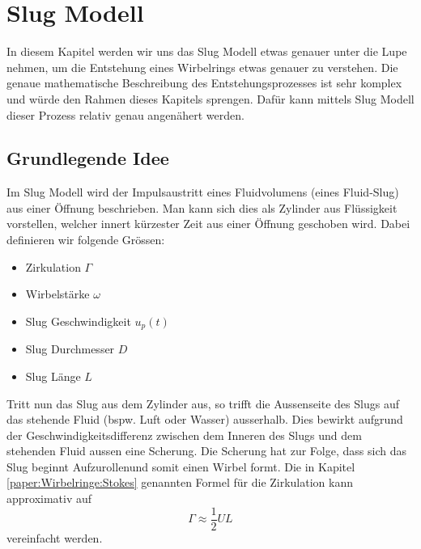 %
%
%
\section{Slug Modell}
In diesem Kapitel werden wir uns das Slug Modell etwas genauer unter die Lupe nehmen, um die Entstehung eines Wirbelrings etwas genauer zu verstehen.
Die genaue mathematische Beschreibung des Entstehungsprozesses ist sehr komplex und würde den Rahmen dieses Kapitels sprengen.
Dafür kann mittels Slug Modell dieser Prozess relativ genau angenähert werden.

\subsection{Grundlegende Idee}
Im Slug Modell wird der Impulsaustritt eines Fluidvolumens (eines Fluid-Slug) aus einer Öffnung beschrieben.
Man kann sich dies als Zylinder aus Flüssigkeit vorstellen, welcher innert kürzester Zeit aus einer Öffnung geschoben wird.
Dabei definieren wir folgende Grössen:
\begin{itemize}
    \item Zirkulation $\Gamma$
    \item Wirbelstärke $\omega$
    \item Slug Geschwindigkeit $u_p(t)$
    \item Slug Durchmesser $D$
    \item Slug Länge $L$
\end{itemize}
Tritt nun das Slug aus dem Zylinder aus, so trifft die Aussenseite des Slugs auf das stehende Fluid (bspw. Luft oder Wasser) ausserhalb.
Dies bewirkt aufgrund der Geschwindigkeitsdifferenz zwischen dem Inneren des Slugs und dem stehenden Fluid aussen eine Scherung.
Die Scherung hat zur Folge, dass sich das Slug beginnt \glqq Aufzurollen\grqq und somit einen Wirbel formt. 
Die in Kapitel \ref{paper:Wirbelringe:Stokes} genannten Formel für die Zirkulation kann approximativ auf
\[
\Gamma \approx \frac{1}{2}UL
\]
vereinfacht werden.

